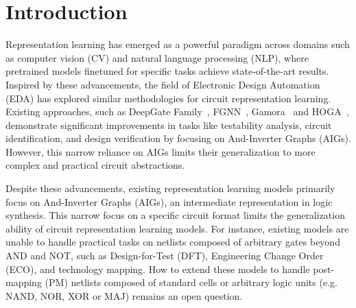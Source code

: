 \section{Introduction} \label{Sec:Intro}

Representation learning has emerged as a powerful paradigm across domains such as computer vision (CV) and natural language processing (NLP), where pretrained models finetuned for specific tasks achieve state-of-the-art results. Inspired by these advancements, the field of Electronic Design Automation (EDA) has explored similar methodologies for circuit representation learning. Existing approaches, such as DeepGate Family~\cite{li2022deepgate, shi2023deepgate2}, FGNN~\cite{wang2022functionality}, Gamora~\cite{wu2023gamora} and HOGA~\cite{deng2024less}, demonstrate significant improvements in tasks like testability analysis, circuit identification, and design verification by focusing on And-Inverter Graphs (AIGs). However, this narrow reliance on AIGs limits their generalization to more complex and practical circuit abstractions.

\iffalse
Despite these advancements, existing representation learning models primarily focus on And-Inverter Graphs (AIGs), an intermediate representation in logic synthesis. This narrow focus on a specific circuit format limits the generalization ability of circuit representation learning models. For instance, existing models are unable to handle practical tasks on netlists composed of arbitrary gates beyond AND and NOT, such as Design-for-Test (DFT), Engineering Change Order (ECO), and technology mapping. How to extend these models to handle post-mapping (PM) netlists composed of standard cells or arbitrary logic units (e.g. NAND, NOR, XOR or MAJ) remains an open question. 


